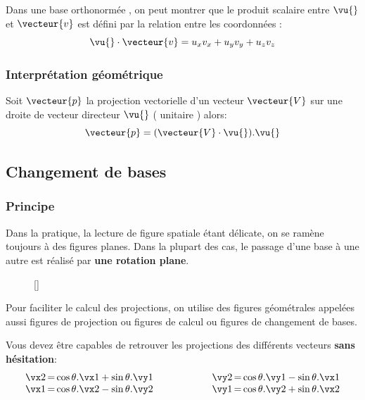 \documentclass[11pt]{article}
\begin{document}
Dans une base orthonormée \bxyz, on peut montrer que le produit scalaire entre $\vu{}$ et $\vecteur{v}$ est défini par la relation entre les coordonnées :  \[\vu{} \cdot \vecteur{v} = u_x v_x+u_y v_y+ u_z v_z\]

\subsubsection{Interprétation géométrique}
Soit $\vecteur{p}$  la projection vectorielle d'un vecteur $\vecteur{V}$ sur une droite de vecteur directeur $\vu{}$ ( unitaire ) alors:  \[\vecteur{p} = (\vecteur{V} \cdot \vu{}).\vu{}\]


\subsection{Changement de bases}
\subsubsection{Principe}

Dans la pratique, la lecture de figure spatiale étant délicate, on se ramène toujours à des figures planes. Dans la plupart des cas, le passage d'une base à une autre est réalisé par \textbf{une rotation plane}.

\begin{figure}
  \centering
  []
	\vspace{-6em} 
\end{figure}
Pour faciliter le calcul des projections, on utilise des figures géométrales appelées aussi figures de projection ou figures de calcul ou figures de changement de bases. 


Vous devez être capables de retrouver les projections des différents vecteurs \textbf{sans hésitation}:
\[\begin{array}{r@{\,=\,}l@{\qquad\qquad\qquad} r@{\,=\,}l}
\vx2 & \cos\theta.\vx1 +\sin\theta.\vy1 &
\vy2 & \cos\theta.\vy1 -\sin\theta.\vx1 \\
\vx1 & \cos\theta.\vx2 -\sin\theta.\vy2 &
\vy1 & \cos\theta.\vy2 +\sin\theta.\vx2
\end{array}\]
\end{document}
